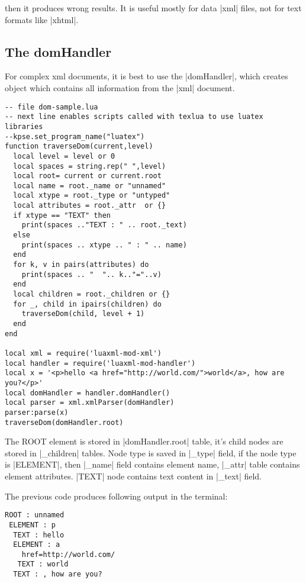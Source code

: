 \documentclass{ltxdoc}
\begin{document}
\noindent then it produces wrong results. It is useful mostly for data |xml| files, not for
text formats like |xhtml|.

\subsection{The domHandler}

For complex xml documents, it is best to use the |domHandler|, which creates object which contains all information
from the |xml| document. 

\begin{verbatim}
-- file dom-sample.lua
-- next line enables scripts called with texlua to use luatex libraries
--kpse.set_program_name("luatex")
function traverseDom(current,level)
  local level = level or 0
  local spaces = string.rep(" ",level)
  local root= current or current.root
  local name = root._name or "unnamed"
  local xtype = root._type or "untyped"
  local attributes = root._attr  or {} 
  if xtype == "TEXT" then 
    print(spaces .."TEXT : " .. root._text)
  else	 
    print(spaces .. xtype .. " : " .. name) 
  end
  for k, v in pairs(attributes) do
    print(spaces .. "  ".. k.."="..v)
  end
  local children = root._children or {}
  for _, child in ipairs(children) do
    traverseDom(child, level + 1)
  end
end

local xml = require('luaxml-mod-xml')
local handler = require('luaxml-mod-handler')
local x = '<p>hello <a href="http://world.com/">world</a>, how are you?</p>'
local domHandler = handler.domHandler()
local parser = xml.xmlParser(domHandler)
parser:parse(x)
traverseDom(domHandler.root)
\end{verbatim}

The ROOT element is stored in |domHandler.root| table, it's child nodes are stored in |_children|
tables. Node type is saved in |_type| field, if the node type is |ELEMENT|, then |_name| field contains 
element name, |_attr| table contains element attributes. |TEXT| node contains text content in |_text| 
field.

The previous code produces following output in the terminal: %

\begin{verbatim}
ROOT : unnamed
 ELEMENT : p
  TEXT : hello
  ELEMENT : a
    href=http://world.com/
   TEXT : world
  TEXT : , how are you?
\end{verbatim}
\end{document}
